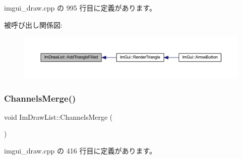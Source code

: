  imgui\+\_\+draw.\+cpp の 995 行目に定義があります。

被呼び出し関係図\+:\nopagebreak
\begin{figure}[H]
\begin{center}
\leavevmode
\includegraphics[width=350pt]{struct_im_draw_list_a2395370cf2dab19fce3c0e2542cd4f25_icgraph}
\end{center}
\end{figure}
\mbox{\label{struct_im_draw_list_a2ed82c3f663cda520c90c55b94196274}} 
\subsubsection{\texorpdfstring{Channels\+Merge()}{ChannelsMerge()}}
{\footnotesize\ttfamily void Im\+Draw\+List\+::\+Channels\+Merge (\begin{DoxyParamCaption}{ }\end{DoxyParamCaption})}



 imgui\+\_\+draw.\+cpp の 416 行目に定義があります。

